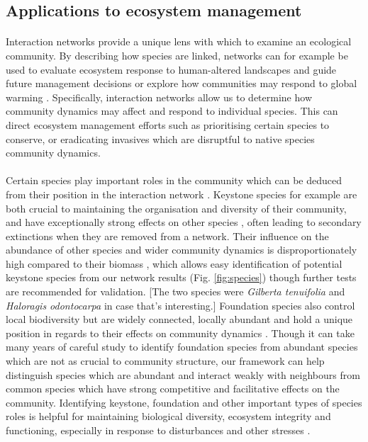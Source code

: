 \documentclass[a4,12pt]{article}
\begin{document}
    \subsection{Applications to ecosystem management}

        \paragraph{}
        Interaction networks provide a unique lens with which to examine an ecological community. By describing how species are linked, networks can for example be used to evaluate ecosystem response to human-altered landscapes and guide future management decisions \citep{Ross2011} or explore how communities may respond to global warming \citep{Gorman2019}. Specifically, interaction networks allow us to determine how community dynamics may affect and respond to individual species. This can direct ecosystem management efforts such as prioritising certain species to conserve, or eradicating invasives which are disruptful to native species community dynamics.

        \paragraph{}
        Certain species play important roles in the community which can be deduced from their position in the interaction network \citep{Cirtwill2018a}. Keystone species for example are both crucial to maintaining the organisation and diversity of their community, and have exceptionally strong effects on other species \citep{Mills1993}, often leading to secondary extinctions when they are removed from a network. Their influence on the abundance of other species and wider community dynamics is disproportionately high compared to their biomass \citep{Power1996, Piraino2002, Libralato2006}, which allows easy identification of potential keystone species from our network results (Fig. \ref{fig:species}) though further tests are recommended for validation. [The two species were \textit{Gilberta tenuifolia} and \textit{Haloragis odontocarpa} in case that's interesting.] Foundation species also control local biodiversity but are widely connected, locally abundant and hold a unique position in regards to their effects on community dynamics \citep{Ellison2005, Baiser2013, Ellison2019}. Though it can take many years of careful study to identify foundation species from abundant species which are not as crucial to community structure, our framework can help distinguish species which are abundant and interact weakly with neighbours from common species which have strong competitive and facilitative effects on the community. Identifying keystone, foundation and other important types of species roles is helpful for maintaining biological diversity, ecosystem integrity and functioning, especially in response to disturbances and other stresses \citep{Nyakatya2008, Orwin2016, Losapio2017, Narwani2019}.
\end{document}
